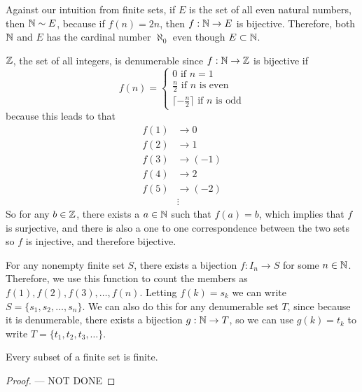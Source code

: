 \begin{remark}
	Against our intuition from finite sets, if $E$ is the set of all even natural numbers, then $\mathbb{N}\sim E$, because if $f(n)=2n$, then $f:\mathbb{N}\rightarrow E$ is bijective. Therefore, both $\mathbb{N}$ and $E$ has the cardinal number $\aleph_0$ even though $E\subset \mathbb{N}$.
\end{remark}

\begin{eg}
	$\mathbb{Z}$, the set of all integers, is denumerable since $f:\mathbb{N} \rightarrow \mathbb{Z}$ is bijective if $$f(n)=\begin{cases}
		0 \text{ if $n=1$}\\
		\frac{n}{2} \text{ if $n$ is even}\\
		\lceil-\frac{n}{2}\rceil \text{ if $n$ is odd}
	\end{cases}$$
	because this leads to that
	\begin{align*}
		f(1) &\rightarrow 0 \\
		f(2) &\rightarrow 1 \\
		f(3) &\rightarrow (-1) \\
		f(4) &\rightarrow 2 \\
		f(5) &\rightarrow (-2) \\
		&\vdots
	\end{align*}
	So for any $b\in \mathbb{Z}$, there exists a $a\in \mathbb{N}$ such that $f(a)=b$, which implies that $f$ is surjective, and there is also a one to one correspondence between the two sets so $f$ is injective, and therefore bijective.
\end{eg}

\begin{notation}
	For any nonempty finite set $S$, there exists a bijection $f:I_n\rightarrow S$ for some $n\in \mathbb{N}$. Therefore, we use this function to count the members as $f(1),f(2),f(3),\hdots,f(n)$. Letting $f(k)=s_k$ we can write $S=\{s_1,s_2,\hdots,s_n\}$. We can also do this for any denumerable set $T$, since because it is denumerable, there exists a bijection $g:\mathbb{N}\rightarrow T$, so we can use $g(k)=t_k$ to write $T=\{t_1,t_2,t_3,\hdots\}$.
\end{notation}

\begin{lemma}
	\label{lemmalabel1}
	Every subset of a finite set is finite.
\end{lemma}

\begin{proof}
	--- NOT DONE
\end{proof}


